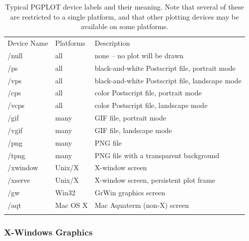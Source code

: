 \begin{table}[t]
  \begin{center}
  \caption[a]{Typical PGPLOT device labels and their meaning.
    Note that several of these are restricted to a single platform,
    and that other plotting devices may be available on some platforms.}
  {\label{Table:plot_devs}}
    \begin{tabular}{lll}
      \noalign{\smallskip}
      Device Name & Platforms & Description   \\
      \noalign{\smallskip}    \hline    \noalign{\smallskip}
       /null     & all    &  none -- no plot will be drawn\\
       /ps       & all    &  black-and-white Postscript file, portrait mode\\
       /vps      & all    &  black-and-white Postscript file, landscape mode\\
       /cps      & all    &  color Postscript file, portrait mode\\
       /vcps     & all    &  color Postscript file, landscape mode\\
       /gif      & many   &  GIF file, portrait mode\\
       /vgif     & many   &  GIF file, landscape mode\\
       /png      & many   &  PNG file\\
       /tpng     & many   &  PNG file with a transparent background\\
       /xwindow  & Unix/X &  X-window screen\\
       /xserve   & Unix/X &  X-window screen, persistent plot frame\\
       /gw       & Win32  &  GrWin graphics screen\\
       /aqt      & Mac OS X  &  Mac Aquaterm (non-X) screen\\
      \noalign{\smallskip}    \hline
    \end{tabular}
  \end{center}
\end{table}


\subsubsection{X-Windows Graphics} \label{Ch:Plot-X}
{}


